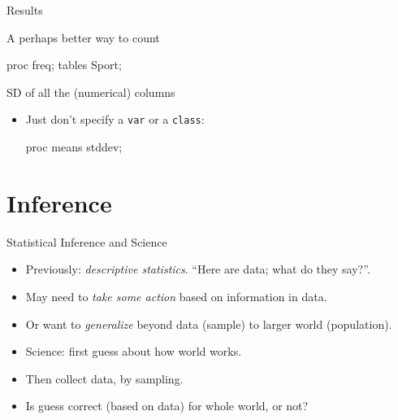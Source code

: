 \documentclass[unknownkeysallowed]{beamer}\usepackage[]{graphicx}\usepackage[]{color}
\begin{document}
\begin{frame}[fragile]{Results}
  
  
  
\end{frame}

\begin{frame}[fragile]{A perhaps better way to count}
  
  \begin{Sascode}[store=sd]
proc freq;
  tables Sport;
  \end{Sascode}
  
  
\end{frame}


\begin{frame}[fragile]{SD of all the (numerical) columns}
  
  \begin{itemize}
  \item Just don't specify a \texttt{var} or a \texttt{class}:
    
    \begin{Sascode}[store=se]
proc means stddev;
    \end{Sascode}
    
  \end{itemize}
  
\end{frame}



\section{Inference}

\frame{\sectionpage}


\begin{frame}{Statistical Inference and Science}



\begin{itemize}
\item Previously: \emph{descriptive statistics}. ``Here are data; what
  do they say?''.
\item May need to \emph{take some action} based on information in data.
\item Or want to \emph{generalize} beyond data (sample) to larger
  world (population).
\item Science: first guess about how world works.
\item Then collect data, by sampling.
\item Is guess correct (based on data) for whole world, or not?
\end{itemize}

\end{frame}
\end{document}
